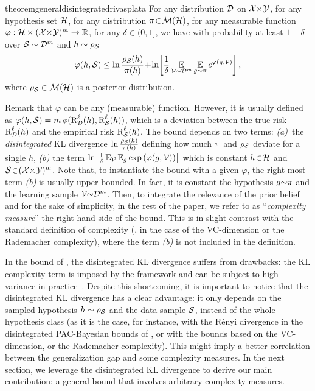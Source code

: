\documentclass[twoside]{article}
\theoremstyle{plain}
\begin{document}
\begin{restatable}{theorem}{generaldisintegratedrivasplata}\label{theorem:general-disintegrated-rivasplata}
For any distribution $\Dcal$ on $\Xcal{\times}\Ycal$, for any hypothesis set $\Hcal$, for any distribution $\P\!\in\!\Mcal(\Hcal)$, for any measurable function $\varphi: \Hcal\times(\Xcal{\times}\Ycal)^m\to \R$, for any $\delta\!\in\!(0, 1]$, we have with probability at least $1-\delta$ over $\Scal\sim\Dcal^m$ and $h\sim\AQ$
\begin{align*}
\varphi(h,\Scal) \le \ln\frac{\AQ(h)}{\P(h)}\!+\!\ln\!\left[\frac{1}{\delta}\EE_{\Vcal\sim\Dcal^m}\EE_{g\sim\P}e^{\varphi(g,\Vcal)}\right],
\end{align*}
where $\AQ\in\Mcal(\Hcal)$ is a posterior distribution.
\end{restatable}

Remark that $\varphi$ can be any (measurable) function. 
However, it is usually defined as $\varphi(h,\Scal)=m\,\phi(\RiskLoss_{\Dcal}(h), \RiskLoss_{\Scal}(h))$, which is a deviation between the true risk $\RiskLoss_{\Dcal}(h)$ and the empirical risk $\RiskLoss_{\Scal}(h)$.
The bound depends on two terms: \mbox{{\it (a)} the} {\it disintegrated} KL divergence $\ln\tfrac{\AQ(h)}{\P(h)}$ defining how much $\P$ and $\AQ$ deviate for a single $h$, {\it (b)} the term $\ln\!\LB\frac{1}{\delta}\EE_{\Vcal}\EE_{g} \exp\LP\varphi(g,\Vcal)\RP\RB$ which is constant \wrt $h\!\in\!\Hcal$ and $\Scal\!\in\!(\Xcal{\times}\Ycal)^m$. 
Note that, to instantiate the bound with a given $\varphi$, the right-most term {\it (b)} is usually upper-bounded.
In fact, it is constant \wrt the hypothesis $g{\sim}\P$ and the learning sample $\Vcal{\sim}\Dcal^m$.
Then, to integrate the relevance of the prior belief and for the sake of simplicity, in the rest of the paper, we refer to as ``\textit{complexity measure}'' the right-hand side of the bound.
This is in slight contrast with the standard definition of complexity (\eg, in the case of the VC-dimension or the Rademacher complexity), where the term {\it (b)} is not included in the definition.

In the bound of , the disintegrated KL divergence suffers from drawbacks: the KL complexity term is imposed by the framework and can be subject to high variance in practice~\citep{viallard2024general}.
Despite this shortcoming, it is important to notice that the disintegrated KL divergence has a clear advantage: it only depends on the sampled hypothesis $h\sim\AQ$ and the data sample $\Scal$, instead of the whole hypothesis class (as it is the case, for instance, with the Rényi divergence in the disintegrated PAC-Bayesian bounds of \citet{viallard2024general}, or with the bounds based on the VC-dimension, or the Rademacher complexity). 
This might imply a better correlation between the generalization gap and some complexity measures.
In the next section, we leverage the disintegrated KL divergence to derive our main contribution: a general bound that involves arbitrary complexity measures. 
\end{document}
